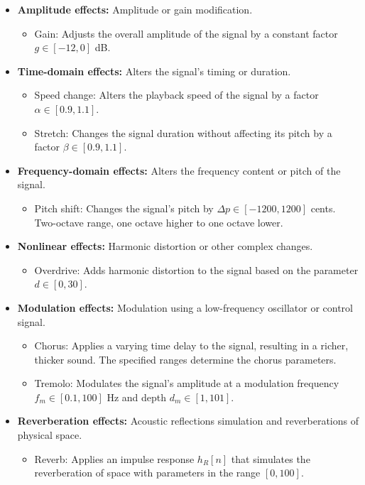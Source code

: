 \begin{itemize}
\item \textbf{Amplitude effects:} Amplitude or gain modification.
\begin{itemize}
    \item Gain: Adjusts the overall amplitude of the signal by a constant factor $g \in [-12, 0]$ dB.
\end{itemize}

\item \textbf{Time-domain effects:} Alters the signal's timing or duration.
\begin{itemize}
    \item Speed change: Alters the playback speed of the signal by a factor $\alpha \in [0.9, 1.1]$.
    \item Stretch: Changes the signal duration without affecting its pitch by a factor $\beta \in [0.9, 1.1]$.
\end{itemize}

\item \textbf{Frequency-domain effects:} Alters the frequency content or pitch of the signal.
\begin{itemize}
    \item Pitch shift: Changes the signal's pitch by $\Delta p \in [-1200, 1200]$ cents. Two-octave range, one octave higher to one octave lower.
\end{itemize}

\item \textbf{Nonlinear effects:} Harmonic distortion or other complex changes.
\begin{itemize}
    \item Overdrive: Adds harmonic distortion to the signal based on the parameter $d \in [0, 30]$.
\end{itemize}

\item \textbf{Modulation effects:} Modulation using a low-frequency oscillator or control signal.
\begin{itemize}
    \item Chorus: Applies a varying time delay to the signal, resulting in a richer, thicker sound. The specified ranges determine the chorus parameters.
    \item Tremolo: Modulates the signal's amplitude at a modulation frequency $f_m \in [0.1, 100]$ Hz and depth $d_m \in [1, 101]$.
\end{itemize}

\item \textbf{Reverberation effects:} Acoustic reflections simulation and reverberations of physical space.
\begin{itemize}
    \item Reverb: Applies an impulse response $h_R[n]$ that simulates the reverberation of space with parameters in the range $[0, 100]$.
\end{itemize}


\end{itemize}
